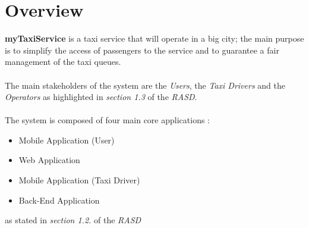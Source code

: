 \section{Overview} %
\label{sec:overview}
\textbf{myTaxiService} is a taxi service that will operate in a big city; the main purpose is to simplify the access of passengers to the service and to guarantee a fair management of the taxi queues.\\\\
The main stakeholders of the system are the \emph{Users}, the \emph{Taxi Drivers} and the \emph{Operators} as highlighted in \emph{section 1.3} of the \emph{RASD}.\\\\
The system is composed of four main core applications :
\begin{itemize}
	\item Mobile Application (User)
	\item Web Application
	\item Mobile Application (Taxi Driver)
	\item Back-End Application
\end{itemize}
 as stated in \emph{section 1.2.} of the \emph{RASD}

